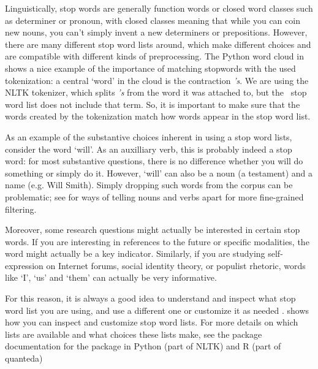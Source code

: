 Linguistically, stop words are generally function words or closed word classes such as determiner or pronoun,
with closed classes meaning that while you can coin new nouns, you can't simply invent a new determiners or prepositions.
However, there are many different stop word lists around, which make different choices and are compatible with
different kinds of preprocessing.
The Python word cloud in  shows a nice example of the importance of matching stopwords with the used
tokenization: a central `word' in the cloud is the contraction \emph{'s}.
We are using the NLTK tokenizer, which splits \emph{'s} from the word it was attached to, but the \sklearn\ stop word list
does not include that term.
So, it is important to make sure that the words created by the tokenization match how words appear in the stop word list.

As an example of the substantive choices inherent in using a stop word lists,
consider the word `will'.
As an auxilliary verb, this is probably indeed a stop word: for most substantive questions, there is no difference
whether you will do something or simply do it.
However, `will' can also be a noun (a testament) and a name (e.g. Will Smith).
Simply dropping such words from the corpus can be problematic; see  for ways of telling nouns and verbs apart
for more fine-grained filtering.

Moreover, some research questions might actually be interested in certain stop words.
If you are interesting in references to the future or specific modalities,
the word might actually be a key indicator. 
Similarly, if you are studying self-expression on Internet forums, social identity theory, or populist rhetoric,
words like `I', `us' and `them' can actually be very informative.

For this reason, it is always a good idea to understand and inspect what stop word list you are using,
and use a different one or customize it as needed \citep[see also][]{nothman18}.
 shows how you can inspect and customize stop word lists.
For more details on which lists are available and what choices these lists make,
see the package documentation for the  package in Python (part of NLTK) and R (part of quanteda)




